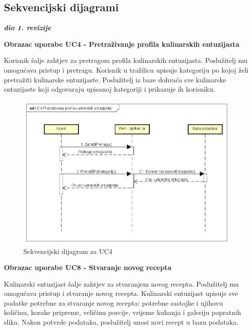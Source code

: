 			\subsection{Sekvencijski dijagrami}
				
				\textbf{\textit{dio 1. revizije}}\\
				
				\begin{large}{\textbf{Obrazac uporabe UC4 - Pretraživanje profila kulinarskih entuzijasta}}\end{large}
				
				Korisnik šalje zahtjev za pretragom profila kulinarskih entuzijasta. Poslužitelj mu omogućava pristup i pretragu. Korisnik u tražilicu upisuje kategoriju po kojoj želi pretražiti kulinarske entuzijaste. Poslužitelj iz baze dohvaća sve kulinarske entuzijaste koji odgovaraju upisanoj kategoriji i prikazuje ih korisniku.
				
					
				\begin{figure}[H]
			\includegraphics[scale=0.4]{dijagrami/SEQ_UC4.png} %
			\centering
			\caption{Sekvencijski dijagram za UC4}
			\label{SEQ_UC4}
		\end{figure}
	

				\begin{large}{\textbf{Obrazac uporabe UC8 - Stvaranje novog recepta}}\end{large}
				
				Kulinarski entuzijast šalje zahtjev za stvaranjem novog recepta. Poslužitelj mu omogućava pristup i stvaranje novog recepta. Kulinarski entuzijast upisuje sve podatke potrebne za stvaranje novog recepta: potrebne sastojke i njihovu količinu, korake pripreme, veličinu porcije, vrijeme kuhanja i galeriju popratnih slika. Nakon potvrde podataka, poslužitelj unosi novi recept u bazu podataka.
				
